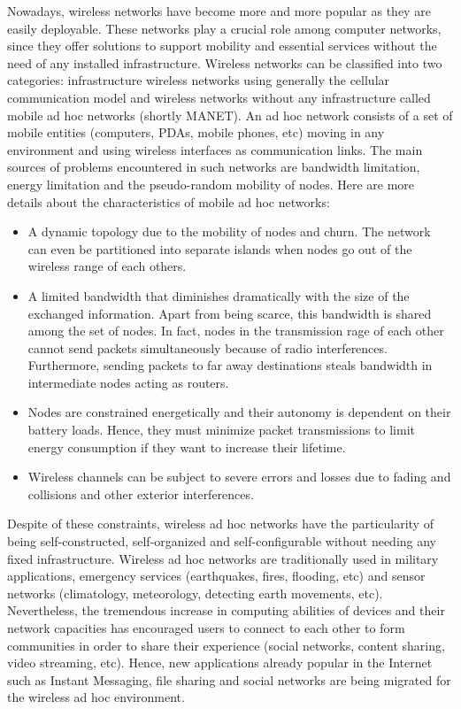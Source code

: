 Nowadays, wireless networks have become more and more popular as they are easily deployable. These networks play a crucial role among computer networks, since they offer solutions to support mobility and essential services without the need of any installed infrastructure. Wireless networks can be classified into two categories: infrastructure wireless networks using generally the cellular communication model and wireless networks without any infrastructure called mobile ad hoc networks (shortly MANET). An ad hoc network consists of a set of mobile entities (computers, PDAs, mobile phones, etc) moving in any environment and using wireless interfaces as communication links. The main sources of problems encountered in such networks are bandwidth limitation, energy limitation and the pseudo-random mobility of nodes. Here are more details about the characteristics of mobile ad hoc networks:
\begin{itemize}
\item{A dynamic topology due to the mobility of nodes and churn. The network can even be partitioned into separate islands when nodes go out of the wireless range of each others.}
\item{A limited bandwidth that diminishes dramatically with the size of the exchanged information. Apart from being scarce, this bandwidth is shared among the set of nodes. In fact, nodes in the transmission rage of each other cannot send packets simultaneously because of radio interferences.  Furthermore, sending packets to far away destinations steals bandwidth in intermediate nodes acting as routers.} 
\item{Nodes are constrained energetically and their autonomy is dependent on their battery loads. Hence, they must minimize packet transmissions to limit energy consumption if they want to increase their lifetime.}
\item{Wireless channels can be subject to severe errors and losses due to fading and collisions and other exterior interferences.}
\end{itemize}

Despite of these constraints, wireless ad hoc networks have the particularity of being self-constructed, self-organized and self-configurable without needing any fixed infrastructure. Wireless ad hoc networks are traditionally used in military applications, emergency services (earthquakes, fires, flooding, etc) and sensor networks (climatology, meteorology, detecting earth movements, etc). Nevertheless, the tremendous increase in computing abilities of devices and their network capacities has encouraged users to connect to each other to form communities in order to share their experience (social networks, content sharing, video streaming, etc). Hence, new applications already popular in the Internet such as Instant Messaging, file sharing and social networks are being migrated for the wireless ad hoc environment.

